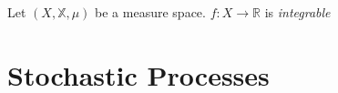 \begin{definition}
    
\end{definition}

\begin{definition}
    Let $(X,\mathbb{X},\mu)$ be a measure space. $f:X\rightarrow\mathbb{R}$
    is \emph{integrable} 
\end{definition}

\begin{definition}
    
\end{definition}

\begin{definition}[Expectation]
    
\end{definition}

\begin{definition}
    
\end{definition}

\begin{theorem}[Tonelli]
    
\end{theorem}

\begin{theorem}[Fubini]
    
\end{theorem}

\begin{definition}
    
\end{definition}

\section{Stochastic Processes}

\begin{definition}
    
\end{definition}

\begin{definition}[Martingales]
    
\end{definition}

\begin{definition}
    
\end{definition}

